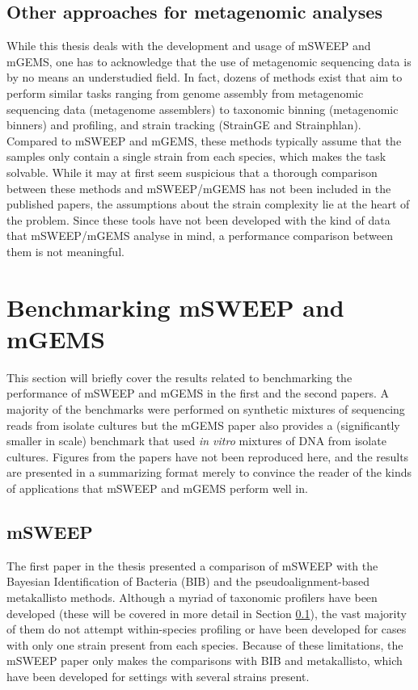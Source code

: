 \documentclass[officiallayout]{tktla}
\begin{document}
\subsection{Other approaches for metagenomic analyses}
\label{other-metagenomics-approaches}
While this thesis deals with the development and usage of mSWEEP and
mGEMS, one has to acknowledge that the use of metagenomic sequencing
data is by no means an understudied field. In fact, dozens of methods
exist that aim to perform similar tasks ranging from genome assembly
from metagenomic sequencing data (metagenome assemblers) to taxonomic
binning (metagenomic binners) and profiling, and strain tracking
(StrainGE and Strainphlan). Compared to mSWEEP and mGEMS, these
methods typically assume that the samples only contain a single strain
from each species, which makes the task solvable. While it may at
first seem suspicious that a thorough comparison between these methods
and mSWEEP/mGEMS has not been included in the published papers, the
assumptions about the strain complexity lie at the heart of the
problem. Since these tools have not been developed with the kind of
data that mSWEEP/mGEMS analyse in mind, a performance comparison
between them is not meaningful.

\section{Benchmarking mSWEEP and mGEMS}
This section will briefly cover the results related to benchmarking
the performance of mSWEEP and mGEMS in the first and the second
papers. A majority of the benchmarks were performed on synthetic
mixtures of sequencing reads from isolate cultures but the mGEMS paper
also provides a (significantly smaller in scale) benchmark that used
\textit{in vitro} mixtures of DNA from isolate cultures. Figures from
the papers have not been reproduced here, and the results are
presented in a summarizing format merely to convince the reader of the
kinds of applications that mSWEEP and mGEMS perform well in.

\subsection{mSWEEP}
The first paper in the thesis presented a comparison of mSWEEP with
the Bayesian Identification of Bacteria (BIB) and the
pseudoalignment-based metakallisto methods. Although a myriad of
taxonomic profilers have been developed (these will be covered in more
detail in Section \ref{other-metagenomics-approaches}), the vast
majority of them do not attempt within-species profiling or have been
developed for cases with only one strain present from each
species. Because of these limitations, the mSWEEP paper only makes the
comparisons with BIB and metakallisto, which have been developed for
settings with several strains present.
\end{document}
